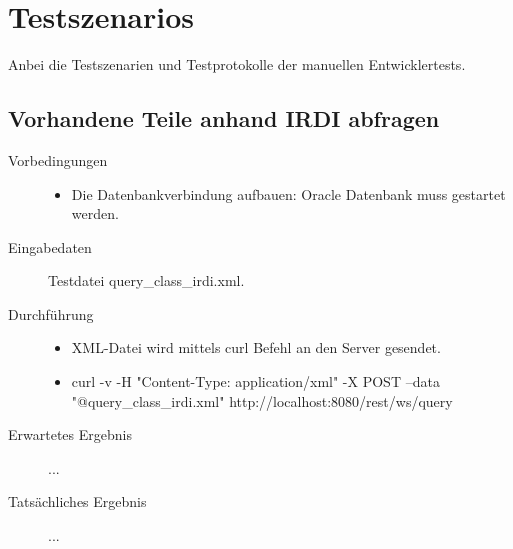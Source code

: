 \chapter{Testszenarios} \label{anh:testszenarios}

Anbei die Testszenarien und Testprotokolle der manuellen Entwicklertests.


\section{Vorhandene Teile anhand IRDI abfragen}

\begin{description}
\item[Vorbedingungen] 
  \begin{itemize}
   \item Die Datenbankverbindung aufbauen: Oracle Datenbank muss gestartet werden.
  \end{itemize}
\item[Eingabedaten] Testdatei query\_class\_irdi.xml. 
\item[Durchführung]
   \begin{itemize}
   \item XML-Datei wird mittels curl Befehl an den Server gesendet.
   \item curl -v -H "Content-Type: application/xml" -X POST --data "@query\_class\_irdi.xml" http://localhost:8080/rest/ws/query
  \end{itemize}
\item[Erwartetes Ergebnis] ...
\item[Tatsächliches Ergebnis] ...
\end{description}

